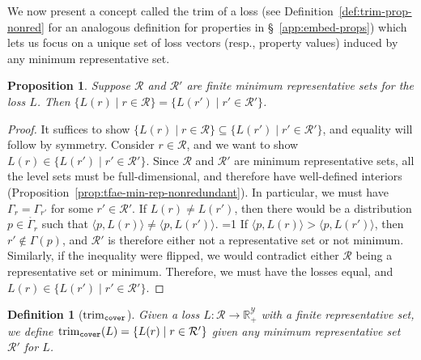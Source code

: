 \documentclass[11pt]{article}
\newcommand{\Comments}{1}
\newcommand{\mytodo}[2]{\ifnum\Comments=1%
  \todo[linecolor=#1!80!black,backgroundcolor=#1,bordercolor=#1!80!black]{#2}\fi}
\newcommand{\jessiet}[1]{\mytodo{teal!20!white}{JF: #1}}
\newcommand{\reals}{\mathbb{R}}
\newcommand{\R}{\mathcal{R}}
\newcommand{\Y}{\mathcal{Y}}
\newcommand{\inprod}[2]{\langle #1, #2 \rangle}%
\newcommand{\inter}[1]{\mathring{#1}}%
\newcommand{\trim}{\mathrm{trim}}
\newcommand{\trimcover}{\mathrm{trim}_{\tt cover}}
\newtheorem{proposition}{Proposition}
\newtheorem{definition}{Definition}
\begin{document}
We now present a concept called the $\trim$ of a loss (see Definition~\ref{def:trim-prop-nonred} for an analogous definition for properties in \S~\ref{app:embed-props}) which lets us focus on a unique set of loss vectors (resp., property values) induced by any minimum representative set.

\begin{proposition}\label{prop:trim-unique}
  Suppose $\R$ and $\R'$ are finite minimum representative sets for the loss $L$.
  Then $\{L(r) \mid r \in \R\} = \{L(r') \mid r' \in \R'\}$.
\end{proposition}
\begin{proof}
  It suffices to show $\{L(r) \mid r \in \R\} \subseteq \{L(r') \mid r' \in \R'\}$, and equality will follow by symmetry.
  Consider $r\in \R$, and we want to show $L(r) \in \{L(r') \mid r' \in \R'\}$.
  Since $\R$ and $\R'$ are minimum representative sets, all the level sets must be full-dimensional, and therefore have well-defined interiors (Proposition~\ref{prop:tfae-min-rep-nonredundant}).
  In particular, we must have $\Gamma_r = \Gamma_{r'}$ for some $r' \in \R'$.
  If $L(r) \neq L(r')$, then there would be a distribution $p \in \inter{\Gamma_r}$ such that $\inprod{p}{L(r)} \neq \inprod{p}{L(r')}$. \jessiet{This needs more detail}
  If $\inprod{p}{L(r)} > \inprod{p}{L(r')}$, then $r' \not \in \Gamma(p)$, and $\R'$ is therefore either not a representative set or not minimum.
  Similarly, if the inequality were flipped, we would contradict either $\R$ being a representative set or minimum.
  Therefore, we must have the losses equal, and $L(r) \in \{L(r') \mid r' \in \R'\}$.
\end{proof}

\begin{definition}[$\trimcover$]\label{def:trim-loss}
  Given a loss $L:\R \to \reals_+^\Y$ with a finite representative set, we define $\trimcover(L) = \{L(r) \mid r \in \R'\}$ given any minimum representative set $\R'$ for $L$.
\end{definition}
\end{document}
